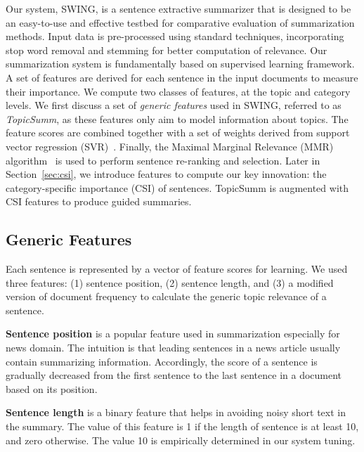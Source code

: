 Our system, SWING, is a sentence extractive summarizer that is designed to be an easy-to-use and effective testbed for comparative evaluation of summarization methods.  Input data is pre-processed using standard techniques, incorporating stop word removal and stemming for better computation of relevance. Our summarization system is fundamentally based on supervised learning framework. A set of features are derived for each sentence in the input documents to measure their importance. We compute two classes of features, at the topic and category levels. We first discuss a set of \textit{generic features} used in SWING, 
referred to as \textit{TopicSumm}, as these features only aim to model information about topics. The feature scores are combined together with a set of weights derived from support vector regression (SVR)~\cite{svr}. Finally, the Maximal Marginal Relevance (MMR) algorithm~\cite{carbonell1998use} is used to perform sentence re-ranking and selection. Later in Section~\ref{sec:csi}, we introduce features to compute our key innovation: the category-specific importance (CSI) of sentences. TopicSumm is augmented with CSI features to produce guided summaries.

\subsection{Generic Features}
\label{sysoverview:features}
Each sentence is represented by a vector of feature scores for learning.  We used three features: (1) sentence position, (2) sentence length, and (3) a modified version of document frequency to calculate the generic topic relevance of a sentence.

\noindent\textbf{Sentence position} \cite{Edmundson:1969} is a popular feature used in summarization especially for news domain. The intuition is that leading sentences in a news article usually contain summarizing information. Accordingly, the score of a sentence is gradually decreased from the first sentence to the last sentence in a document based on its position.

\noindent\textbf{Sentence length} is a binary feature that helps in avoiding noisy short text in the summary. The value of this feature is 1 if the length of sentence is at least 10, and zero otherwise. The value 10 is empirically determined in our system tuning.

